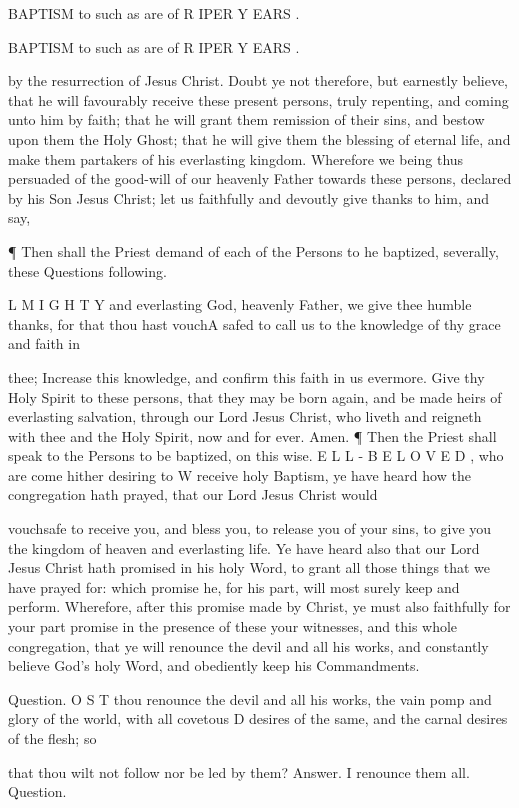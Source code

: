 BAPTISM to such as are of R IPER Y EARS .

BAPTISM to such as are of R IPER Y EARS .

by the resurrection of Jesus Christ. Doubt ye not therefore, but earnestly believe, that he will favourably receive these present persons, truly repenting, and coming unto him by faith; that he will grant them remission of their sins, and bestow upon them the Holy Ghost; that he will give them the blessing of eternal life, and make them partakers of his everlasting kingdom. Wherefore we being thus persuaded of the good-will of our heavenly Father towards these persons, declared by his Son Jesus Christ; let us faithfully and devoutly give thanks to him, and say,

¶ Then shall the Priest demand of each of the Persons to he baptized, severally, these Questions following.

L M I G H T Y and everlasting God, heavenly Father, we give thee humble thanks, for that thou hast vouchA safed to call us to the knowledge of thy grace and faith in

thee; Increase this knowledge, and confirm this faith in us evermore. Give thy Holy Spirit to these persons, that they may be born again, and be made heirs of everlasting salvation, through our Lord Jesus Christ, who liveth and reigneth with thee and the Holy Spirit, now and for ever. Amen. ¶ Then the Priest shall speak to the Persons to be baptized, on this wise. E L L - B E L O V E D , who are come hither desiring to W receive holy Baptism, ye have heard how the congregation hath prayed, that our Lord Jesus Christ would

vouchsafe to receive you, and bless you, to release you of your sins, to give you the kingdom of heaven and everlasting life. Ye have heard also that our Lord Jesus Christ hath promised in his holy Word, to grant all those things that we have prayed for: which promise he, for his part, will most surely keep and perform. Wherefore, after this promise made by Christ, ye must also faithfully for your part promise in the presence of these your witnesses, and this whole congregation, that ye will renounce the devil and all his works, and constantly believe God’s holy Word, and obediently keep his Commandments.

Question. O S T thou renounce the devil and all his works, the vain pomp and glory of the world, with all covetous D desires of the same, and the carnal desires of the flesh; so

that thou wilt not follow nor be led by them? Answer. I renounce them all. Question.

